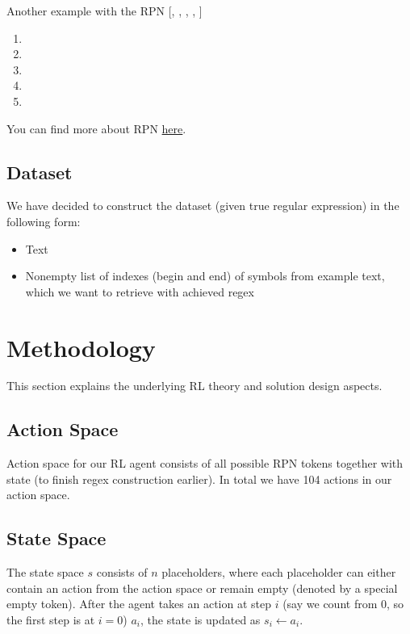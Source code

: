 \documentclass{article}
\begin{document}
Another example with the RPN {[\codeword{\d}, , \codeword{|}, \codeword{[]}, \codeword{+} ]}
\begin{enumerate}
  \item \codeword{\d}
  \item {}
  \item {}
  \item \codeword{[\d|@]}
  \item \codeword{[\d|@]+}
\end{enumerate}

You can find more about RPN \href{https://en.wikipedia.org/wiki/Reverse_Polish_notation}{here}.


\subsection{Dataset}

We have decided to construct the dataset (given true regular expression) in the following form:
\begin{itemize}
  \item Text
  \item Nonempty list of indexes (begin and end) of symbols from example text, which we want to retrieve with achieved regex
\end{itemize}

\section{Methodology}
This section explains the underlying RL theory and solution design aspects.
\subsection{Action Space}
Action space for our RL agent consists of all possible RPN tokens together with  state (to finish regex construction earlier). In total we have 104 actions in our action space.

\subsection{State Space}
The state space $s$ consists of $n$ placeholders, where each placeholder can either contain an action
from the action space or remain empty (denoted by a special empty token). After the agent
takes an action at step $i$ (say we count from 0, so the first step is at $i=0$) $a_i$, the state
is updated as $s_i \gets a_i$.
\end{document}
